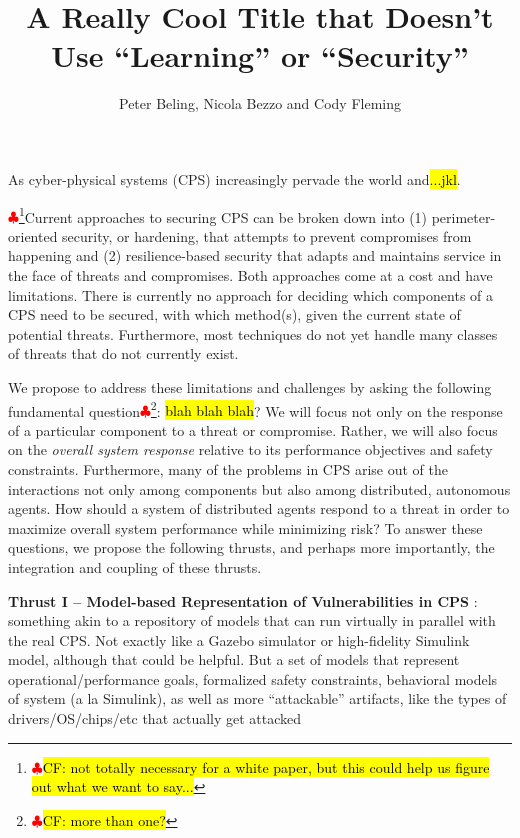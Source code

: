 \documentclass[11pt,letterpaper]{article}
\title{A Really Cool Title that Doesn't Use ``Learning'' or ``Security''}
\author{Peter Beling, Nicola Bezzo and Cody Fleming}
\date{}
\newcommand{\boldheading}[1]{{\vspace{0.1in}\noindent \bf #1} \hspace{0.06in}}
\newcommand\CF[1]{\textcolor{red}{$\clubsuit$\footnote{\textcolor{red}{$\clubsuit$}\hl{CF: #1}}}}
\begin{document}
\maketitle


\noindent As cyber-physical systems (CPS) increasingly pervade the world and\hl{...jkl}.

\CF{not totally necessary for a white paper, but this could help us figure out what we want to say...}Current approaches to securing CPS can be broken down into (1) perimeter-oriented security, or hardening, that attempts to prevent compromises from happening and (2) resilience-based security that adapts and maintains service in the face of threats and compromises. Both approaches come at a cost and have limitations. There is currently no approach for deciding which components of a CPS need to be secured, with which method(s), given the current state of potential threats. Furthermore, most techniques do not yet handle many classes of threats that do not currently exist.

We propose to address these limitations and challenges by asking the following fundamental question\CF{more than one?}: \hl{blah blah blah}? We will focus not only on the response of a particular component to a threat or compromise. Rather, we will also focus on the {\em overall system response} relative to its performance objectives and safety constraints. Furthermore, many of the problems in CPS arise out of the interactions not only among components but also among distributed, autonomous agents. How should a system of distributed agents respond to a threat in order to maximize overall system performance while minimizing risk?
To answer these questions, we propose the following thrusts, and perhaps more importantly, the integration and coupling of these thrusts.

\boldheading{Thrust I -- Model-based Representation of Vulnerabilities in CPS}: something akin to a repository of models that can run virtually in parallel with the real CPS. Not exactly like a Gazebo simulator or high-fidelity Simulink model, although that could be helpful. But a set of models that represent operational/performance goals, formalized safety constraints, behavioral models of system (a la Simulink), as well as more ``attackable'' artifacts, like the types of drivers/OS/chips/etc that actually get attacked
\end{document}
